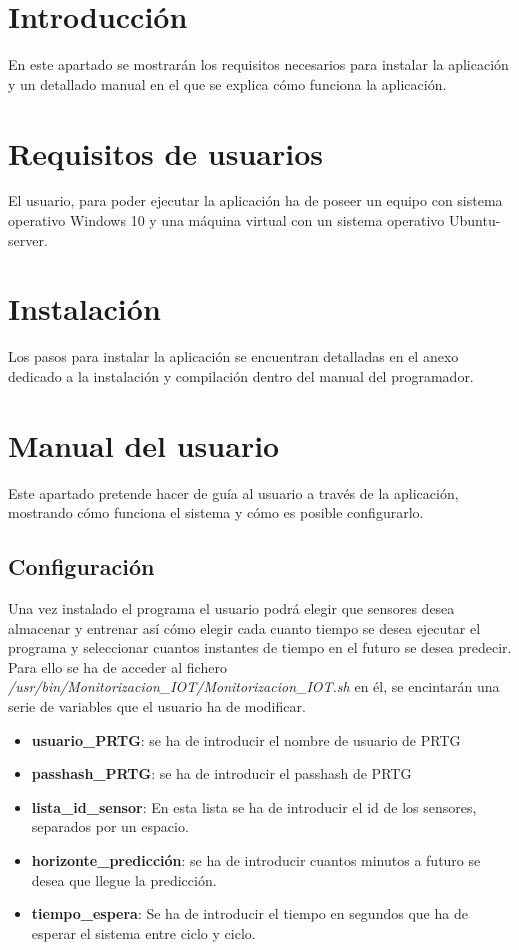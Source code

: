 
\section{Introducción}

En este apartado se mostrarán los requisitos necesarios para instalar la aplicación y un detallado manual en el que se explica cómo funciona la aplicación. 

\section{Requisitos de usuarios}

El usuario, para poder ejecutar la aplicación ha de poseer un equipo con sistema operativo Windows 10 y una máquina virtual con un sistema operativo Ubuntu-server.

\section{Instalación}

Los pasos para instalar la aplicación se encuentran detalladas en el anexo dedicado a la instalación y compilación dentro del manual del programador.


\section{Manual del usuario}

Este apartado pretende hacer de guía al usuario a través de la aplicación, mostrando cómo funciona el sistema y cómo es posible configurarlo.

\subsection{Configuración}

Una vez instalado el programa el usuario podrá elegir que sensores desea almacenar y entrenar así cómo elegir cada cuanto tiempo se desea ejecutar el programa y seleccionar cuantos instantes de tiempo en el futuro se desea predecir. Para ello se ha de acceder al fichero \textit{/usr/bin/Monitorizacion\_IOT/Monitorizacion\_IOT.sh} en él, se encintarán una serie de variables que el usuario ha de modificar.

\begin{itemize}
    \item \textbf{usuario\_PRTG}: se ha de introducir el nombre de usuario de PRTG
    \item \textbf{passhash\_PRTG}: se ha de introducir el passhash de PRTG
    \item \textbf{lista\_id\_sensor}: En esta lista se ha de introducir el id de los sensores, separados por un espacio.
    \item \textbf{horizonte\_predicción}: se ha de introducir cuantos minutos a futuro se desea que llegue la predicción.
    \item \textbf{tiempo\_espera}: Se ha de introducir el tiempo en segundos que ha de esperar el sistema entre ciclo y ciclo. 
\end{itemize}

